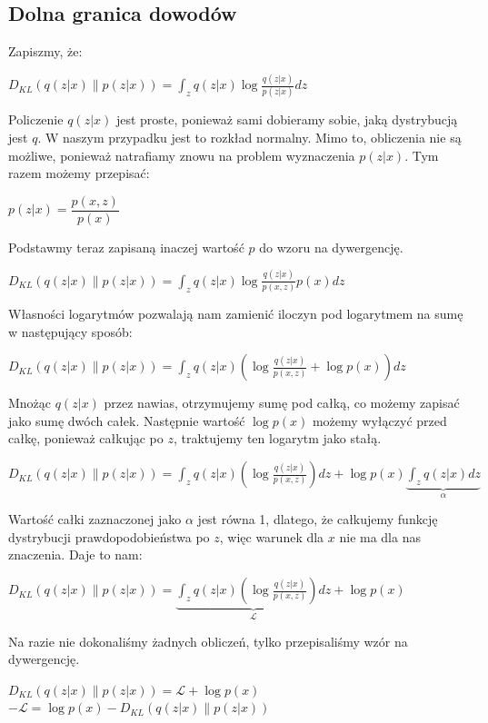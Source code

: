 \documentclass[a4paper,12pt,oneside]{book} %
\begin{document}
\subsection{Dolna granica dowodów}
Zapiszmy, że:
\begin{center}
	$D_{KL}(q(z|x)\|p(z|x))=\displaystyle\int_{z}^{}q(z|x)\log\frac{q(z|x)}{p(z|x)}dz$
\end{center}
Policzenie $q(z|x)$ jest proste, ponieważ sami dobieramy sobie, jaką dystrybucją jest $q$. W naszym przypadku jest to rozkład normalny. Mimo to, obliczenia nie są możliwe, ponieważ natrafiamy znowu na problem wyznaczenia $p(z|x)$. Tym razem możemy przepisać:
\begin{center}
	$p(z|x)=\dfrac{p(x,z)}{p(x)}$
\end{center}
Podstawmy teraz zapisaną inaczej wartość $p$ do wzoru na dywergencję.
\begin{center}
	$D_{KL}(q(z|x)\|p(z|x))=\displaystyle\int_{z}^{}q(z|x)\log\frac{q(z|x)}{p(x,z)}p(x)dz$
\end{center}
Własności logarytmów pozwalają nam zamienić iloczyn pod logarytmem na sumę w następujący sposób:
\begin{center}
	$D_{KL}(q(z|x)\|p(z|x))=\displaystyle\int_{z}^{}q(z|x)\left( \log\frac{q(z|x)}{p(x,z)} + \log p(x)\right) dz$
\end{center}
Mnożąc $q(z|x)$ przez nawias, otrzymujemy sumę pod całką, co możemy zapisać jako sumę dwóch całek. Następnie wartość $\log p(x)$ możemy wyłączyć przed całkę, ponieważ całkując po $z$, traktujemy ten logarytm jako stałą.
\begin{center}
	$D_{KL}(q(z|x)\|p(z|x))=\displaystyle\int_{z}^{}q(z|x)\left( \log\frac{q(z|x)}{p(x,z)}\right)dz + \log p(x)\underbrace{\displaystyle\int_{z}^{}q(z|x)dz}_{\text{$\alpha$}}$
\end{center}
Wartość całki zaznaczonej jako $\alpha$ jest równa 1, dlatego, że całkujemy funkcję dystrybucji prawdopodobieństwa po $z$, więc warunek dla $x$ nie ma dla nas znaczenia. Daje to nam:
\begin{center}
	$D_{KL}(q(z|x)\|p(z|x))=\underbrace{\displaystyle\int_{z}^{}q(z|x)\left( \log\frac{q(z|x)}{p(x,z)}\right)dz}_{\text{$\mathcal{L}$}} + \log p(x)$
\end{center}
Na razie nie dokonaliśmy żadnych obliczeń, tylko przepisaliśmy wzór na dywergencję.
\begin{center}
	$D_{KL}(q(z|x)\|p(z|x))= \mathcal{L} + \log p(x)$\\
	$-\mathcal{L} = \log p(x) - D_{KL}(q(z|x)\|p(z|x))$
\end{center}
\end{document}
